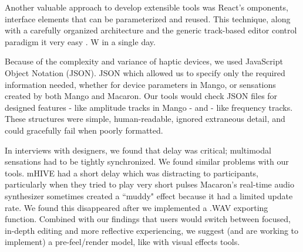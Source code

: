 Another valuable approach to develop extensible tools was React's omponents, interface elements that can be parameterized and reused.
This technique, along with a carefully organized architecture and the generic track-based editor control paradigm it very easy .
W  in a single day.


Because of the complexity and variance of haptic devices, we 
 used JavaScript Object Notation (JSON).
JSON which allowed us to specify only the required information needed, whether for device parameters in Mango, or sensations created by both Mango and Macaron.
Our tools would check JSON files for designed features - like amplitude tracks in Mango - and  - like frequency tracks.
These structures were simple, human-readable, ignored extraneous detail, and could gracefully fail when poorly formatted.

In interviews with designers, we found that delay was critical; multimodal sensations had to be tightly synchronized.
We found similar problems with our tools.
mHIVE had a short delay which was distracting to participants, particularly when they tried to play very short pulses\osE{;}
Macaron's real-time audio synthesizer sometimes created a ``muddy" effect because it had a limited update rate.
We found this disappeared after we implemented a .WAV exporting function.
Combined with our findings that users would switch between focused, in-depth editing and more reflective experiencing, we suggest (and are working to implement) a pre-feel/render model, like with visual effects tools.

